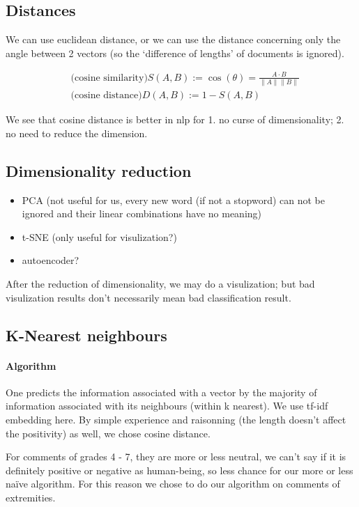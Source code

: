 \documentclass{article}
\begin{document}
\subsection{Distances}

We can use euclidean distance, or we can use the distance concerning
only the angle between 2 vectors (so the `difference of lengths' of documents
is ignored).

$$
\begin{aligned}
&\text{(cosine similarity)}S(A, B) :=
\cos (\theta)=\frac{A \cdot B}{\|A\|\|B\|}\\
&\text{(cosine distance)}D(A, B) :=1-S(A, B)
\end{aligned}
$$

We see that cosine distance is better in nlp for 1. no curse of dimensionality; 2. no
need to reduce the dimension.

\subsection{Dimensionality reduction}

\begin{itemize}
  \item PCA (not useful for us, every new word (if not a stopword) can not be ignored and their linear combinations have no meaning)
  \item t-SNE (only useful for visulization?)
  \item autoencoder?
\end{itemize}

After the reduction of dimensionality, we may do a visulization; but
bad visulization results don't necessarily mean bad classification result.

\subsection{K-Nearest neighbours}
\label{subset:knn}

\paragraph{Algorithm} One predicts the information associated with a vector by the majority
of information associated with its neighbours (within k nearest).
We use tf-idf embedding here.
By simple experience
and raisonning (the length doesn't affect the positivity) as well, we chose cosine distance.

For comments of grades 4 - 7, they are more or less neutral, we can't
say if it is definitely positive or negative as human-being, so less chance
for our more or less naïve algorithm. For this reason we chose
to do our algorithm on comments of extremities.
\end{document}
